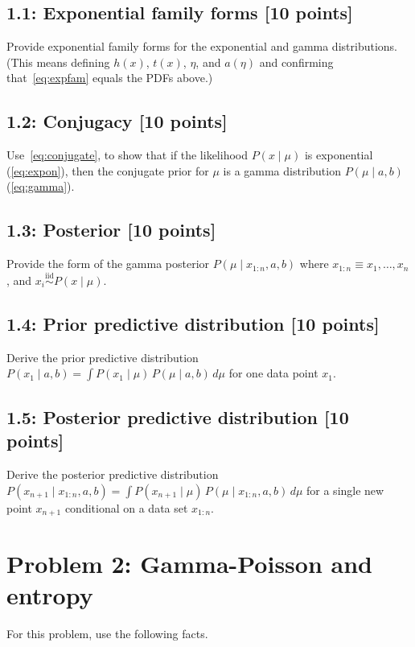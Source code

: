 \documentclass{article}
\begin{document}
\subsection*{1.1: Exponential family forms [10 points]} 

Provide exponential family forms for the exponential and gamma distributions. (This means defining $h(x)$, $t(x)$, $\eta$, and $a(\eta)$ and confirming that~\cref{eq:expfam} equals the PDFs above.)

\subsection*{1.2: Conjugacy [10 points]}

Use~\cref{eq:conjugate}, to show that if the likelihood $P(x \mid \mu)$ is exponential (\cref{eq:expon}), then the conjugate prior for $\mu$ is a gamma distribution $P(\mu \mid a, b)$ (\cref{eq:gamma}). 

\subsection*{1.3: Posterior [10 points]}
Provide the form of the gamma posterior $P(\mu \mid x_{1:n}, a, b)$ where $x_{1:n} \equiv x_1, \dots, x_n$, and $x_i \stackrel{\textrm{iid}}{\sim} P(x \mid \mu)$.

\subsection*{1.4: Prior predictive distribution [10 points]}

Derive the prior predictive distribution $P(x_1 \mid a, b) \!=\! \int P(x_1 \mid \mu) \, P(\mu \mid a, b) \,d\mu$ for one data point $x_1$.

\subsection*{1.5: Posterior predictive distribution [10 points]} 

Derive the posterior predictive distribution $P(x_{n+1} \mid x_{1:n}, a, b) \!=\! \int P(x_{n+1} \mid \mu) \, P(\mu \mid x_{1:n}, a, b) \,d\mu$ for a single new point $x_{n+1}$ conditional on a data set $x_{1:n}$.

\section*{Problem 2: Gamma-Poisson and entropy}
For this problem, use the following facts.
\end{document}
